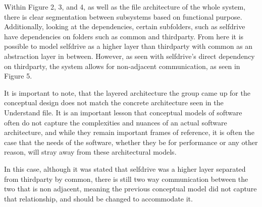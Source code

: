 \documentclass[12pt]{article}
\begin{document}
Within Figure 2, 3, and 4, as well as the file architecture of the whole system, there is clear segmentation between subsystems based on functional purpose. Additionally, looking at the dependencies, certain subfolders, such as selfdrive have dependencies on folders such as common and third\textunderscore party. From here it is possible to model selfdrive as a higher layer than third\textunderscore party with common as an abstraction layer in between. However, as seen with selfdrive's direct dependency on third\textunderscore party, the system allows for non-adjacent communication, as seen in Figure 5.

It is important to note, that the layered architecture the group came up for the conceptual design does not match the concrete architecture seen in the Understand file. It is an important lesson that conceptual models of software often do not capture the complexities and nuances of an actual software architecture, and while they remain important frames of reference, it is often the case that the needs of the software, whether they be for performance or any other reason, will stray away from these architectural models.

In this case, although it was stated that selfdrive was a higher layer separated from third\textunderscore party by common, there is still two way communication between the two that is non adjacent, meaning the previous conceptual model did not capture that relationship, and should be changed to accommodate it.
\end{document}
